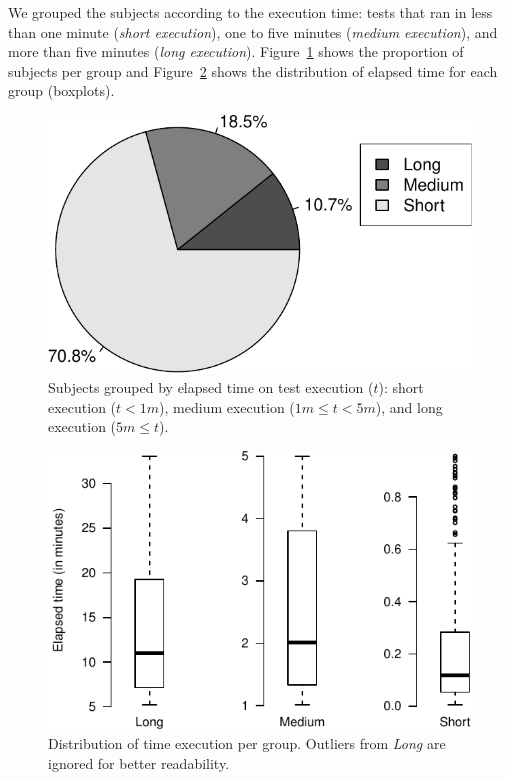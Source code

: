 We grouped the subjects according to the execution time: tests that
ran in less than one minute (\emph{short execution}), one to five
minutes (\emph{medium execution}), and more than five minutes
(\emph{long execution}). Figure~\ref{fig:piechart-time} shows the
proportion of subjects per group and Figure~\ref{fig:boxplots-time}
shows the distribution of elapsed time for each group (boxplots). 

\begin{figure}[h!]
    \centering
    \begin{minipage}{2in}%
    \includegraphics[width=\textwidth]{plots/piechart-timecost.pdf}
    \end{minipage}%
    \caption{\label{fig:piechart-time} Subjects grouped by elapsed time on test
    execution ($t$): short execution ($t < 1m$), medium execution ($1m \leq t <
    5m$), and long execution ($5m \leq t$).}
\end{figure}

\begin{figure}[h!]
    \centering
    \begin{minipage}{2.5in}%
    \includegraphics[width=\textwidth]{plots/boxplots-timecost.pdf}
    \end{minipage}%
    \caption{\label{fig:boxplots-time} Distribution of time execution
    per group. Outliers from \emph{Long} are ignored for better
    readability.}
\end{figure}

